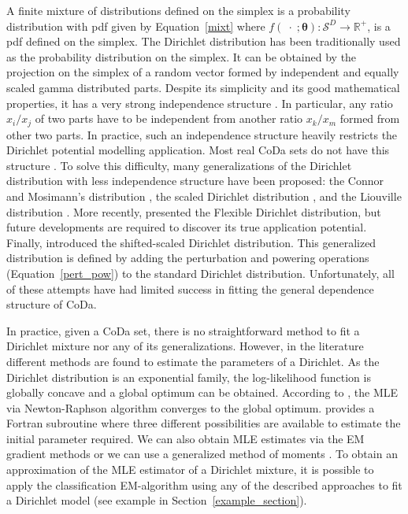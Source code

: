 \documentclass[12pt, a4paper]{article}
\newcommand{\m}[1]{\boldsymbol{#1}}
\theoremstyle{definition}
\begin{document}
\noindent A finite mixture of distributions defined on the simplex is a probability distribution with pdf given by Equation~\ref{mixt} where $f(\;\cdot\;;\m\theta): \mathcal{S}^D \rightarrow \mathbb{R}^+$, is a pdf defined on the simplex. The Dirichlet distribution has been traditionally used as the probability distribution on the simplex. It can be obtained by the projection on the simplex of a random vector formed by independent and equally scaled gamma distributed parts.  Despite its simplicity and its good mathematical properties, it has a very strong independence structure \citep{aitchison1986statistical}. In particular, any ratio $x_i/x_j$ of two parts have to be independent from another ratio $x_k/x_m$ formed from other two parts. In practice, such an independence structure heavily restricts the Dirichlet potential modelling application. Most real CoDa sets do not have this structure \citep{aitchison1986statistical}. To solve this difficulty, many generalizations of the Dirichlet distribution with less independence structure have been proposed: the Connor and Mosimann's distribution \citep{connor1969concepts}, the scaled Dirichlet distribution \citep{aitchison1986statistical},  and the Liouville distribution \citep{rayens1994dependence}.  More recently, \cite{ongaro2008new} presented the Flexible Dirichlet distribution, but future developments are required to discover its true application potential. Finally, \cite{monti2011shifted} introduced the shifted-scaled Dirichlet distribution. This generalized distribution is defined by adding the perturbation and powering operations (Equation~\ref{pert_pow}) to the standard Dirichlet distribution. Unfortunately, all of these attempts have had limited success in fitting the general dependence structure of CoDa.


In practice, given a CoDa set, there is no straightforward method to fit a Dirichlet mixture nor any of its generalizations. However, in the literature different methods are found to estimate the parameters of a Dirichlet. As the Dirichlet distribution is an exponential family, the log-likelihood function is globally concave and a global optimum can be obtained. According to \cite{ng2011dirichlet}, the MLE via Newton-Raphson algorithm converges to the global optimum. \cite{narayanan1991algorithm} provides a Fortran subroutine where three different possibilities are available to estimate the initial parameter required. We can also obtain MLE estimates via the EM gradient methods \citep{ng2011dirichlet} or we can use a generalized method of moments \citep{hansen1982large}. To obtain an approximation of the MLE estimator of a Dirichlet mixture, it is possible to apply the classification EM-algorithm \citep{celeux1992classification} using any of the described approaches to fit a Dirichlet model (see example in Section~\ref{example_section}).
\end{document}
